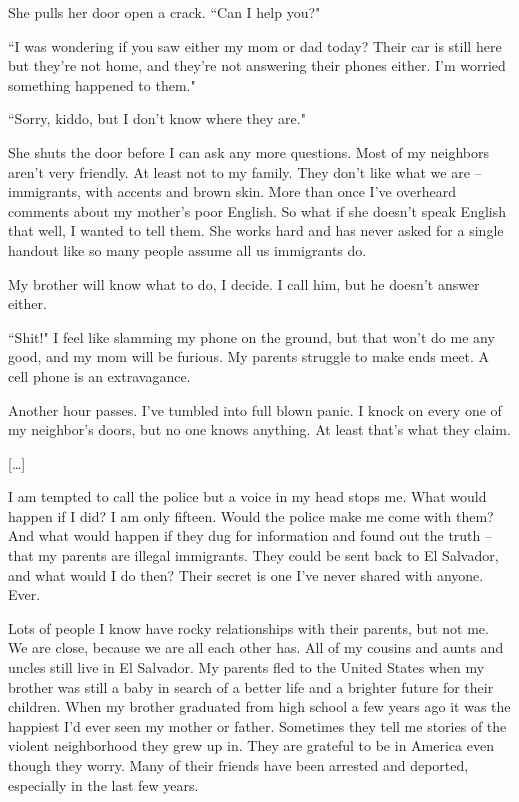 \documentclass[10pt,a4paper]{article}
\newcommand{\qm}[1]{``#1"}
\begin{document}
She pulls her door open a crack. \qm{Can I help you?}

\qm{I was wondering if you saw either my mom or dad today? Their car is still here but they're not home, and they're not answering their phones either. I'm worried something happened to them.}

\qm{Sorry, kiddo, but I don't know where they are.}

She shuts the door before I can ask any more questions. Most of my neighbors aren't very friendly. At least not to my family. They don't like what we are -- immigrants, with accents and brown skin. More than once I've overheard comments about my mother's poor English. So what if she doesn't speak English that well, I wanted to tell them. She works hard and has never asked for a single handout like so many people assume all us immigrants do.

My brother will know what to do, I decide. I call him, but he doesn't answer either.

\qm{Shit!} I feel like slamming my phone on the ground, but that won't do me any good, and my mom will be furious. My parents struggle to make ends meet. A cell phone is an extravagance.

Another hour passes. I've tumbled into full blown panic. I knock on every one of my neighbor's doors, but no one knows anything. At least that's what they claim.

[\ldots]

I am tempted to call the police but a voice in my head stops me. What would happen if I did? I am only fifteen. Would the police make me come with them? And what would happen if they dug for information and found out the truth -- that my parents are illegal immigrants. They could be sent back to El Salvador, and what would I do then? Their secret is one I've never shared with anyone. Ever.

Lots of people I know have rocky relationships with their parents, but not me. We are close, because we are all each other has. All of my cousins and aunts and uncles still live in El Salvador. My parents fled to the United States when my brother was still a baby in search of a better life and a brighter future for their children. When my brother graduated from high school a few years ago it was the happiest I'd ever seen my mother or father. Sometimes they tell me stories of the violent neighborhood they grew up in. They are grateful to be in America even though they worry. Many of their friends have been arrested and deported, especially in the last few years.
\end{document}
